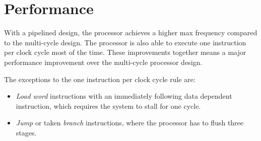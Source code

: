 \section{Performance}
With a pipelined design,
the processor achieves a higher max frequency compared to the multi-cycle design.
The processor is also able to execute one instruction per clock cycle most of the time.
These improvements together means a major performance improvement over the multi-cycle processor design.

The exceptions to the one instruction per clock cycle rule are:
\begin{itemize}
    \item \textit{Load word} instructions with an immediately following data dependent instruction,
        which requires the system to stall for one cycle.
    \item \textit{Jump} or taken \textit{branch} instructions,
        where the processor has to flush three stages.
\end{itemize}

